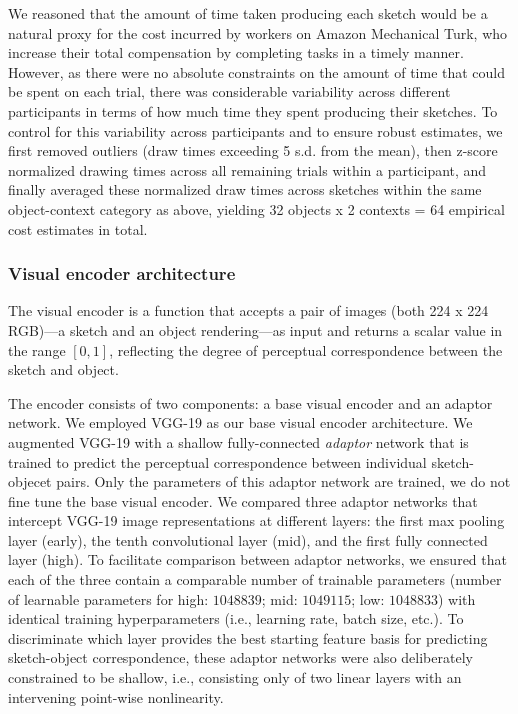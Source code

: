 \documentclass[9pt,twocolumn,twoside]{pnas-new}
\begin{document}
{%
We reasoned that the amount of time taken producing each sketch would be a natural proxy for the cost incurred by workers on Amazon Mechanical Turk, who increase their total compensation by completing tasks in a timely manner. 
However, as there were no absolute constraints on the amount of time that could be spent on each trial, there was considerable variability across different participants in terms of how much time they spent producing their sketches. 
To control for this variability across participants and to ensure robust estimates, we first removed outliers (draw times exceeding 5 s.d. from the mean), then z-score normalized drawing times across all remaining trials within a participant, and finally averaged these normalized draw times across sketches within the same object-context category as above, yielding 32 objects x 2 contexts = 64 empirical cost estimates in total.

\subsubsection*{Visual encoder architecture}

The visual encoder is a function that accepts a pair of images (both 224 x 224 RGB)---a sketch and an object rendering---as input and returns a scalar value in the range $[0,1]$, reflecting the degree of perceptual correspondence between the sketch and object. 

The encoder consists of two components: a base visual encoder and an adaptor network. 
We employed VGG-19 \cite{simonyan2014very} as our base visual encoder architecture.
We augmented VGG-19 with a shallow fully-connected \textit{adaptor} network that is trained to predict the perceptual correspondence between individual sketch-objecet pairs. 
Only the parameters of this adaptor network are trained, we do not fine tune the base visual encoder. 
We compared three adaptor networks that intercept VGG-19 image representations at different layers: the first max pooling layer (early), the tenth convolutional layer (mid), and the first fully connected layer (high). 
To facilitate comparison between adaptor networks, we ensured that each of the three contain a comparable number of trainable parameters (number of learnable parameters for high: $1048839$; mid: $1049115$; low: $1048833$) with identical training hyperparameters (i.e., learning rate, batch size, etc.). 
To discriminate which layer provides the best starting feature basis for predicting sketch-object correspondence, these adaptor networks were also deliberately constrained to be shallow, i.e., consisting only of two linear layers with an intervening point-wise nonlinearity.

}
\end{document}
